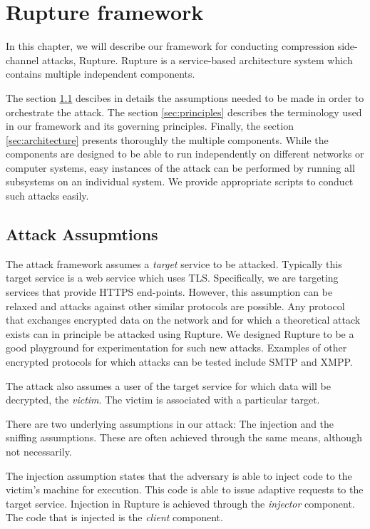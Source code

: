\chapter{Rupture framework}\label{rupture}

In this chapter, we will describe our framework for conducting compression side-channel attacks,
Rupture. Rupture is a service-based architecture system which contains multiple
independent components.

The section \ref{sec:assumptions} descibes in details the assumptions needed to be made 
in order to orchestrate the attack. The section \ref{sec:principles} describes the 
terminology used in our framework and its governing principles. Finally, the section
\ref{sec:architecture} presents thoroughly the multiple components.
While the components are designed to be able to run
independently on different networks or computer systems, easy instances of the
attack can be performed by running all subsystems on an individual system. We
provide appropriate scripts to conduct such attacks easily.


\section{Attack Assupmtions}\label{sec:assumptions}

The attack framework assumes a \textit{target} service to be attacked. Typically
this target service is a web service which uses TLS. Specifically, we are
targeting services that provide HTTPS end-points. However, this assumption can
be relaxed and attacks against other similar protocols are possible. Any
protocol that exchanges encrypted data on the network and for which a
theoretical attack exists can in principle be attacked using Rupture. We
designed Rupture to be a good playground for experimentation for such new
attacks. Examples of other encrypted protocols for which attacks can be tested
include SMTP and XMPP.

The attack also assumes a user of the target service for which data will be
decrypted, the \textit{victim}. The victim is associated with a particular target.

There are two underlying assumptions in our attack: The injection and the
sniffing assumptions. These are often achieved through the same means, although
not necessarily.

The injection assumption states that the adversary is able to
inject code to the victim's machine for execution. This code is able to issue
adaptive requests to the target service. Injection in Rupture is achieved
through the \textit{injector} component. The code that is injected is the \textit{client}
component.

